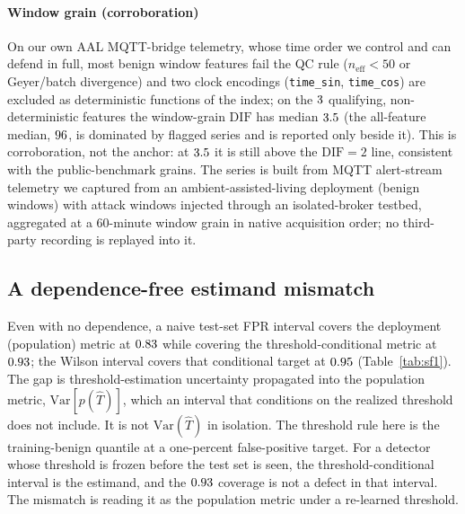 \documentclass[a4paper,fleqn]{cas-dc}
\newcommand{\DIF}{\mathrm{DIF}}
\newcommand{\neff}{n_{\mathrm{eff}}}
\newcommand{\tabwidth}{\columnwidth}
\newcommand{\tabbody}{\small\setlength{\tabcolsep}{3.5pt}\renewcommand{\arraystretch}{1.08}}
\newcommand{\onetab}{\renewcommand{\tabwidth}{\columnwidth}\tabbody}
\begin{document}
\paragraph{Window grain (corroboration)} On our own AAL MQTT-bridge telemetry, whose time order we
control and can defend in full, most benign window features fail the QC rule ($\neff\!<\!50$
or Geyer/batch divergence) and two clock encodings (\texttt{time\_sin}, \texttt{time\_cos}) are
excluded as deterministic functions of the index; on the $3$ qualifying, non-deterministic features
the window-grain $\DIF$ has median $3.5$ (the all-feature median, $96$, is dominated by flagged
series and is reported only beside it). This is corroboration, not the anchor: at $3.5$ it is
still above the $\DIF\!=\!2$ line, consistent with the public-benchmark grains. The series is built
from MQTT alert-stream telemetry we captured from an ambient-assisted-living deployment (benign
windows) with attack windows injected through an isolated-broker testbed, aggregated at a
$60$-minute window grain in native acquisition order; no third-party recording is replayed into it.
\begin{table}[ht]
\centering
\caption{Benign-stream $\DIF$ by grain under the agreement rule (non-deterministic, Geyer and batch
means within $2\times$, $\neff\ge50$). The qualifying entry is the
median of the series that pass; with one packet series that entry is the series itself. From
\texttt{results/dif\_headline.csv}.}\label{tab:grain}
\onetab

\end{table}

\subsection{A dependence-free estimand mismatch}\label{sec:results-sf1}
Even with no dependence, a naive test-set FPR interval covers the deployment (population) metric at
$0.83$ while covering the threshold-conditional metric at $0.93$; the Wilson interval
covers that conditional target at $0.95$ (Table~\ref{tab:sf1}). The gap is
threshold-estimation uncertainty propagated into the population metric, $\mathrm{Var}[p(\hat T)]$,
which an interval that conditions on the realized threshold does not include. It is not
$\mathrm{Var}(\hat T)$ in isolation. The threshold rule here is the training-benign quantile at a one-percent false-positive
target. For a detector whose threshold is frozen before the test set is seen, the
threshold-conditional interval is the estimand, and the $0.93$ coverage is not a defect in
that
interval. The mismatch is reading it as the population metric under a re-learned threshold.
\begin{table}[ht]
\centering
\caption{The conflation gap under independence. From
\texttt{diagnostics/estimand\_conflation.py}.}\label{tab:sf1}
\onetab

\end{table}
\end{document}

